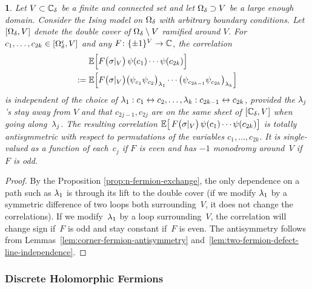 \documentclass[12pt,oneside,english]{amsart}
\numberwithin{equation}{section}
\numberwithin{figure}{section}
\theoremstyle{plain}
\theoremstyle{plain}
\theoremstyle{plain}
\newtheorem{prop}[thm]{\protect\propositionname}
\theoremstyle{plain}
\theoremstyle{remark}
\theoremstyle{definition}
\theoremstyle{plain}
\theoremstyle{plain}
\numberwithin{thm}{section}
\providecommand{\propositionname}{Proposition}
\providecommand{\propositionname}{Proposition}
\providecommand{\propositionname}{Proposition}
\providecommand{\propositionname}{Proposition}
\begin{document}
\begin{prop}
\label{prop:fermion-double-cover}Let $V\subset{\mathbb{C}_{{\delta}}}$
be a finite and connected set and let ${{\Omega}}_{{\delta}} \supset V$ be a large
enough domain. Consider the Ising model on ${{\Omega}}_{{\delta}} $ with arbitrary
boundary conditions. Let ${\left[ {{\Omega}}_{{\delta}} , V \right]}$ denote the double
cover of ${{\Omega}}_{{\delta}} \setminus V$ ramified around $V$. 
For $c_{1},\ldots,c_{2k} \in {\left[ {{\Omega}}_{{\delta}}^{\mathfrak{c}}, V \right]}$
and any $F \colon \{ \pm 1 \}^{V} \to  \mathbb{C} $, the correlation
\begin{align*} %
& \correl{ \phantom{\Big| \!\!} F \big( \spin|_{V} \big) \,
  \ferm(c_{1}) \cdots \ferm(c_{ 2k})
    } \\
:= \; & %
\correl{ \phantom{\Big| \!\!} F \big( \spin|_{V} \big)
    \big( \ferm_{c_{1}} \ferm_{c_{2}} \big)_{\cordefline_{1}} \cdots 
    \big( \ferm_{c_{2k-1}} \ferm_{c_{2k}} \big)_{\cordefline_{k}}
  }
\end{align*}
is independent of the choice of ${\lambda}_{1}:c_{1}\leftrightarrow 
c_{2},\ldots,{\lambda}_{k}:c_{2k-1}\leftrightarrow c_{2k}$,
provided the ${\lambda}_{j}$'s stay away from $V$ and that 
$c_{2j-1},c_{2j}$
are on the same sheet of ${\left[  {\mathbb{C}_{{\delta}}}, V  \right]}$ when
going along~${\lambda}_{j}$. The resulting correlation
$\mathbb{E} \! \left[ { \phantom{\big| \!}F\big({\sigma}|_{V}\big) \,
  {\psi}(c_{1}) \cdots {\psi}(c_{ 2k}) } \right] $
is totally antisymmetric with respect to permutations of the variables
$c_{1},\ldots,c_{2k}$. It is single-valued as a function of each~$c_j$ if 
$F$ is even and has $-1$ monodromy around~$V$ if $F$ is odd. 
\end{prop}
\begin{proof}
By the Proposition \ref{prop:n-fermion-exchange}, the only dependence
on a path such as ${\lambda}_{1}$ is through its lift to the double
cover (if we modify ${\lambda}_{1}$ by a symmetric difference of two
loops both surrounding~$V$, it does not change the correlations).
If we modify~${\lambda}_{1}$ by a loop surrounding~$V$, the 
correlation will change
sign if~$F$ is odd and stay constant if~$F$ is even. The antisymmetry
follows from Lemmas~\ref{lem:corner-fermion-antisymmetry} 
and~\ref{lem:two-fermion-defect-line-independence}. 
\end{proof}
% 
\subsubsection{\label{subsec:medial-lattice-fermions}Discrete Holomorphic 
Fermions}
\end{document}
